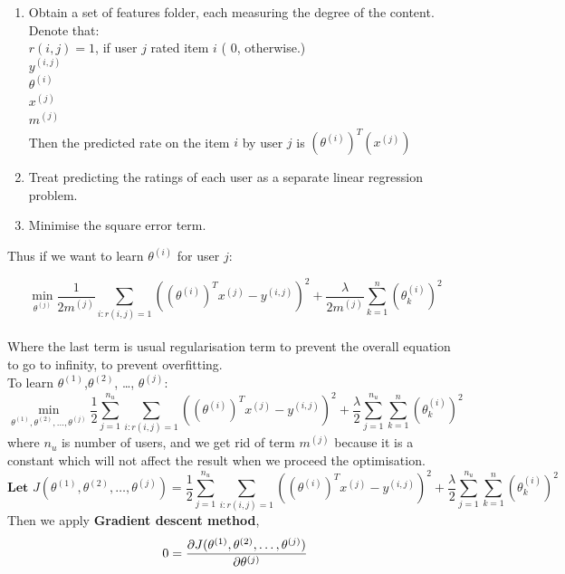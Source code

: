 \begin{enumerate}
\item  Obtain a set of features folder, each measuring the degree of the content.
Denote that:
\\$r(i,j) = 1$,  if user $j$ rated item $i$ ( $0$,  otherwise.)
\\$y^{(i,j)}$ 
\\$\theta^{(i)}$ 
\\$x^{(j)}$ 
\\$m^{(j)}$ 
\\Then the predicted rate on the item $i$ by user $j$ is $(\theta^{(i)})^{T}(x^{(j)})$
\item Treat predicting the ratings of each user as a separate linear regression problem.
\item Minimise the square error term.
\end{enumerate}

Thus if we want to learn $\theta^{(i)}$ for user $j$:

\begin{equation*}
\min_{\theta^{(j)}} \frac{1}{2m^{(j)}}\sum_{i:r(i,j) = 1}\left((\theta^{(i)})^{T}x^{(j)}-y^{(i,j)}\right)^{2} + \frac{\lambda}{2m^{(j)}}\sum_{k = 1}^{n}(\theta^{(i)}_{k})^{2}
\end{equation*}
\\Where the last term is usual regularisation term to prevent the overall equation to go to infinity, to prevent overfitting.
\\ To learn $\theta^{(1)}$,$\theta^{(2)}$, \dots, $\theta^{(j)}$:
\begin{equation*}
\min_{\theta^{(1)},\theta^{(2)}, \dots, \theta^{(j)}} \frac{1}{2}\sum_{j = 1}^{n_{u}}\sum_{i:r(i,j) = 1}\left((\theta^{(i)})^{T}x^{(j)}-y^{(i,j)}\right)^{2} + \frac{\lambda}{2}\sum_{j = 1}^{n_{u}}\sum_{k = 1}^{n}(\theta^{(i)}_{k})^{2}
\end{equation*}
where $n_{u}$ is number of users, and we get rid of term $m^{(j)}$ because it is a constant which will not affect the result when we proceed the optimisation.
\begin{equation*}
\textbf{Let     } J(\theta^{(1)},\theta^{(2)}, \dots, \theta^{(j)}) = \frac{1}{2}\sum_{j = 1}^{n_{u}}\sum_{i:r(i,j) = 1}\left((\theta^{(i)})^{T}x^{(j)}-y^{(i,j)}\right)^{2} + \frac{\lambda}{2}\sum_{j = 1}^{n_{u}}\sum_{k = 1}^{n}(\theta^{(i)}_{k})^{2}
\end{equation*}
Then we apply \textbf{Gradient descent method}, 
\begin{equation*}
\\ 0 = \frac{\partial{J(\theta^{(1)},\theta^{(2)}, \dots, \theta^{(j)})}} {\partial{\theta^{(j)}}}
\end{equation*}

